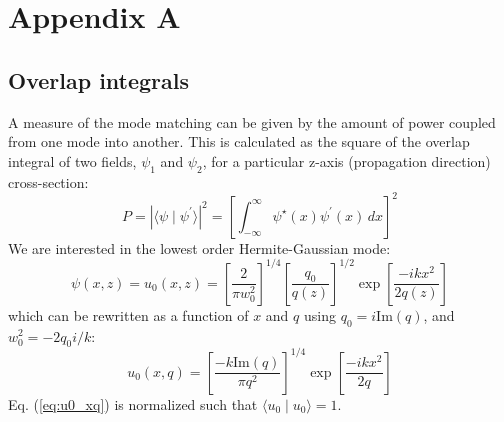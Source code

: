 \chapter{Appendix A}



\section{Overlap integrals}
A measure of the mode matching can be given by the amount of power
coupled from one mode into another. This is calculated as the square
of the overlap integral of two fields, $\psi_1$ and $\psi_2$, for a
particular z-axis (propagation direction) cross-section:
\begin{equation}
P = \left| \langle \psi \mid \psi^{\prime} \rangle \right|^2 = \left[\int_{-\infty}^\infty \psi^\star(x) \psi^{\prime}(x) \, dx \right]^2
\end{equation}
We are interested in the lowest order Hermite-Gaussian mode:
\begin{equation}
\psi(x,z) = u_0(x,z) = \left[ \frac{2}{\pi w_0^2} \right]^{1/4} \left[
  \frac{q_0}{q(z)} \right]^{1/2} \exp{\left[ \frac{-i k x^2}{2 q(z)}
  \right] }
\end{equation}
which can be rewritten as a function of $x$ and $q$ using
$q_0=i \mbox{Im}(q)$, and $w_0^2 = -2 q_0 i/k$:
\begin{equation}
u_0(x,q) = \left[ \frac{-k \mbox{Im}(q)}{\pi q^2} \right]^{1/4} \exp{\left[ \frac{-i k x^2}{2 q}
  \right] }
\label{eq:u0_xq}
\end{equation}
Eq. (\ref{eq:u0_xq}) is normalized such that $\langle u_0 \mid u_0
\rangle = 1$.

